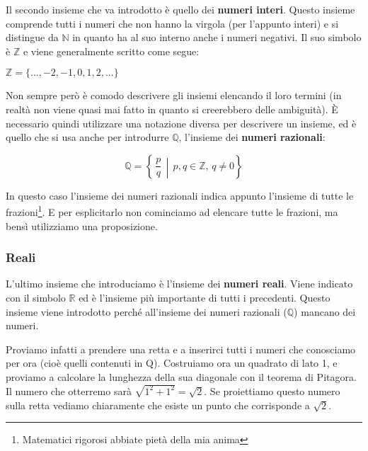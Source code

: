 Il secondo insieme che va introdotto è quello dei \textbf{numeri interi}. Questo insieme comprende tutti i numeri che non hanno la virgola (per l'appunto interi) e si distingue da $\mathbb{N}$ in quanto ha al suo interno anche i numeri negativi. Il suo simbolo è $\mathbb{Z}$ e viene generalmente scritto come segue:
\begin{center}
    $\mathbb{Z} = \{..., -2, -1, 0, 1, 2, ...\}$
\end{center}

Non sempre però è comodo descrivere gli insiemi elencando il loro termini (in realtà non viene quasi mai fatto in quanto si creerebbero delle ambiguità). È necessario quindi utilizzare una notazione diversa per descrivere un insieme, ed è quello che si usa anche per introdurre $\mathbb{Q}$, l'insieme dei \textbf{numeri razionali}:
\begin{center}
    \begin{equation*}
        \mathbb{Q} = \left\{\,\dfrac{p}{q}\, \middle| \, p, q \in \mathbb{Z},\, q \neq 0 \right\}
    \end{equation*}
\end{center}
In questo caso l'insieme dei numeri razionali indica appunto l'insieme di tutte le frazioni\footnote{Matematici rigorosi abbiate pietà della mia anima}. E per esplicitarlo non cominciamo ad elencare tutte le frazioni, ma bensì utilizziamo una proposizione.

\subsubsection{Reali}
L'ultimo insieme che introduciamo è l'insieme dei \textbf{numeri reali}. Viene indicato con il simbolo $\mathbb{R}$ ed è l'insieme più importante di tutti i precedenti. Questo insieme viene introdotto perché all'insieme dei numeri razionali ($\mathbb{Q}$) mancano dei numeri.

Proviamo infatti a prendere una retta e a inserirci tutti i numeri che conosciamo per ora (cioè quelli contenuti in Q). Costruiamo ora un quadrato di lato 1, e proviamo a calcolare la lunghezza della sua diagonale con il teorema di Pitagora. Il numero che otterremo sarà $\sqrt{1^2+1^2} = \sqrt{2}$. Se proiettiamo questo numero sulla retta vediamo chiaramente che esiste un punto che corrisponde a $\sqrt{2}$.

